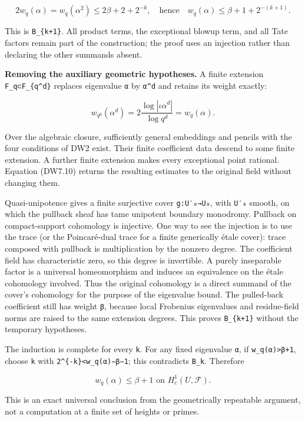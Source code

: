 \documentclass[
]{report}
\begin{document}
\[
2w_q(\alpha)=w_q(\alpha^2)
\le2\beta+2+2^{-k},
\quad\text{hence}\quad
w_q(\alpha)\le\beta+1+2^{-(k+1)}.
\tag{DW7.9}
\]

This is \texttt{B\_\{k+1\}}. All product terms, the exceptional blowup
term, and all Tate factors remain part of the construction; the proof
uses an injection rather than declaring the other summands absent.

\textbf{Removing the auxiliary geometric hypotheses.} A finite extension
\texttt{F\_q⊂F\_\{q\^{}d\}} replaces eigenvalue \texttt{α} by
\texttt{α\^{}d} and retains its weight exactly:

\[
w_{q^d}(\alpha^d)
=2\frac{\log|\iota\alpha^d|}{\log q^d}
=w_q(\alpha).
\tag{DW7.10}
\]

Over the algebraic closure, sufficiently general embeddings and pencils
with the four conditions of DW2 exist. Their finite coefficient data
descend to some finite extension. A further finite extension makes every
exceptional point rational. Equation (DW7.10) returns the resulting
estimates to the original field without changing them.

Quasi-unipotence gives a finite surjective cover \texttt{g:U′₀→U₀}, with
\texttt{U′₀} smooth, on which the pullback sheaf has tame unipotent
boundary monodromy. Pullback on compact-support cohomology is injective.
One way to see the injection is to use the trace (or the Poincaré-dual
trace for a finite generically étale cover): trace composed with
pullback is multiplication by the nonzero degree. The coefficient field
has characteristic zero, so this degree is invertible. A purely
inseparable factor is a universal homeomorphism and induces an
equivalence on the étale cohomology involved. Thus the original
cohomology is a direct summand of the cover's cohomology for the purpose
of the eigenvalue bound. The pulled-back coefficient still has weight
\texttt{β}, because local Frobenius eigenvalues and residue-field norms
are raised to the same extension degrees. This proves
\texttt{B\_\{k+1\}} without the temporary hypotheses.

The induction is complete for every \texttt{k}. For any fixed eigenvalue
\texttt{α}, if \texttt{w\_q(α)\textgreater{}β+1}, choose \texttt{k} with
\texttt{2\^{}\{-k\}\textless{}w\_q(α)−β−1}; this contradicts
\texttt{B\_k}. Therefore

\[
\boxed{w_q(\alpha)\le\beta+1\text{ on }H_c^1(U,\mathcal F).}
\tag{DW7.11}
\]

This is an exact universal conclusion from the geometrically repeatable
argument, not a computation at a finite set of heights or primes.
\end{document}
